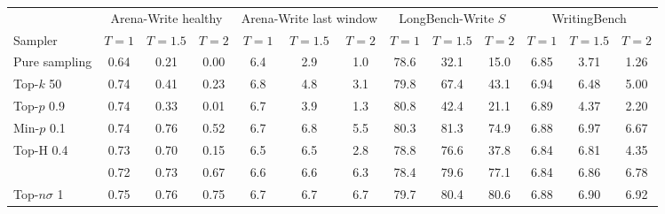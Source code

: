\begin{tabular}{lcccccccccccc}
\toprule
 & \multicolumn{3}{c}{Arena-Write healthy} & \multicolumn{3}{c}{Arena-Write last window} & \multicolumn{3}{c}{LongBench-Write $S$} & \multicolumn{3}{c}{WritingBench} \\
\cmidrule(lr){2-4} \cmidrule(lr){5-7} \cmidrule(lr){8-10} \cmidrule(lr){11-13}
Sampler & $T{=}1$ & $T{=}1.5$ & $T{=}2$ & $T{=}1$ & $T{=}1.5$ & $T{=}2$ & $T{=}1$ & $T{=}1.5$ & $T{=}2$ & $T{=}1$ & $T{=}1.5$ & $T{=}2$ \\
\midrule
Pure sampling & 0.64 & 0.21 & 0.00 & 6.4 & 2.9 & 1.0 & 78.6 & 32.1 & 15.0 & 6.85 & 3.71 & 1.26 \\
Top-$k$ 50 & 0.74 & 0.41 & 0.23 & 6.8 & 4.8 & 3.1 & 79.8 & 67.4 & 43.1 & 6.94 & 6.48 & 5.00 \\
Top-$p$ 0.9 & 0.74 & 0.33 & 0.01 & 6.7 & 3.9 & 1.3 & 80.8 & 42.4 & 21.1 & 6.89 & 4.37 & 2.20 \\
Min-$p$ 0.1 & 0.74 & 0.76 & 0.52 & 6.7 & 6.8 & 5.5 & 80.3 & 81.3 & 74.9 & 6.88 & 6.97 & 6.67 \\
Top-H 0.4 & 0.73 & 0.70 & 0.15 & 6.5 & 6.5 & 2.8 & 78.8 & 76.6 & 37.8 & 6.84 & 6.81 & 4.35 \\
\pless{} & 0.72 & 0.73 & 0.67 & 6.6 & 6.6 & 6.3 & 78.4 & 79.6 & 77.1 & 6.84 & 6.86 & 6.78 \\
Top-$n\sigma$ 1 & 0.75 & 0.76 & 0.75 & 6.7 & 6.7 & 6.7 & 79.7 & 80.4 & 80.6 & 6.88 & 6.90 & 6.92 \\
\bottomrule
\end{tabular}
